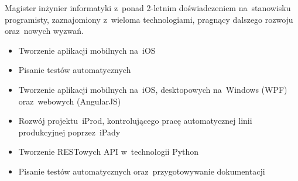 \documentclass[11pt,a4paper]{article}
\begin{document}
    \bigskip

  
    \smallskip

    \noindent
    Magister inżynier informatyki z~ponad 2-letnim doświadczeniem na~stanowisku programisty, zaznajomiony z~wieloma
    technologiami, pragnący dalszego rozwoju oraz~nowych wyzwań.
  

    \bigskip


    \smallskip

    \vspace{-0.2cm}
    \begin{itemize} \itemsep1pt \parskip0pt 
        \item Tworzenie aplikacji mobilnych na~iOS
        \item Pisanie testów automatycznych
    \end{itemize}
    \vspace{-0.2cm}
    \vspace{-0.2cm}
    \begin{itemize} \itemsep1pt \parskip0pt 
        \item Tworzenie aplikacji mobilnych na~iOS, desktopowych na~Windows (WPF) oraz~webowych (AngularJS)
        \item Rozwój projektu~iProd, kontrolującego pracę automatycznej linii produkcyjnej poprzez~iPady
        \item Tworzenie RESTowych API w~technologii Python
        \item Pisanie testów automatycznych oraz~przygotowywanie dokumentacji
    \end{itemize}

\end{document}
